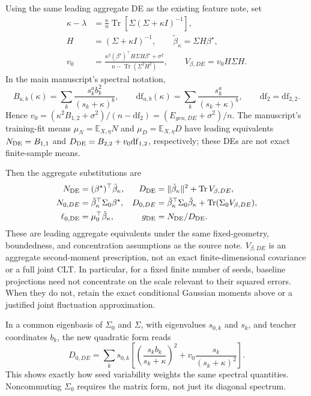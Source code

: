 \documentclass[11pt]{article}
\newcommand{\E}{\mathbb E}
\newcommand{\Tr}{\operatorname{Tr}}
\newcommand{\bstar}{{\beta^{\star}}}
\begin{document}
Using the same leading aggregate DE as the existing feature note, set
\begin{align}
 \kappa-\lambda&=\frac{\kappa}{n}\Tr[\Sigma(\Sigma+\kappa I)^{-1}],\\
 H&=(\Sigma+\kappa I)^{-1},\qquad
 \tilde\beta_\kappa=\Sigma H\bstar,\\
 v_0&=\frac{\kappa^2(\bstar)^\top H\Sigma H\bstar+\sigma^2}
 {n-\Tr(\Sigma^2H^2)},\qquad V_{\beta,DE}=v_0H\Sigma H.
\end{align}
In the main manuscript's spectral notation,
\[
 B_{a,b}(\kappa)=\sum_k\frac{s_k^a b_k^2}{(s_k+\kappa)^b},\qquad
 \mathrm{df}_{a,b}(\kappa)=\sum_k\frac{s_k^a}{(s_k+\kappa)^b},\qquad
 \mathrm{df}_2=\mathrm{df}_{2,2}.
\]
Hence $v_0=(\kappa^2B_{1,2}+\sigma^2)/(n-\mathrm{df}_2)
=(E_{gen,DE}+\sigma^2)/n$. The manuscript's training-fit means
$\mu_N=\E_{X,\eta}N$ and $\mu_D=\E_{X,\eta}D$ have leading equivalents
$N_{\rm DE}=B_{1,1}$ and
$D_{\rm DE}=B_{2,2}+v_0\mathrm{df}_{1,2}$, respectively;
these DEs are not exact finite-sample means.

Then the aggregate substitutions are
\begin{align}
 N_{\rm DE}&=(\bstar)^\top\tilde\beta_\kappa,&
 D_{\rm DE}&=\|\tilde\beta_\kappa\|^2+\Tr V_{\beta,DE},\\
 N_{0,DE}&=\tilde\beta_\kappa^\top \Sigma_0\bstar,&
 D_{0,DE}&=\tilde\beta_\kappa^\top \Sigma_0\tilde\beta_\kappa+\Tr(\Sigma_0 V_{\beta,DE}),\\
 \ell_{0,\rm DE}&=\mu_0^\top\tilde\beta_\kappa,&
 g_{\rm DE}&=N_{\rm DE}/D_{\rm DE}.
\end{align}
These are leading aggregate equivalents under the same fixed-geometry,
boundedness, and concentration assumptions as the source note. $V_{\beta,DE}$ is an
aggregate second-moment prescription, not an exact finite-dimensional
covariance or a full joint CLT. In particular, for a fixed finite number of
seeds, baseline projections need not concentrate on the scale relevant to
their squared errors. When they do not, retain the exact conditional
Gaussian moments above or a justified joint fluctuation approximation.

In a common eigenbasis of $\Sigma_0$ and $\Sigma$, with eigenvalues $s_{0,k}$
and $s_k$, and teacher coordinates $b_k$, the new quadratic form reads
\[
 D_{0,DE}=
 \sum_k s_{0,k}\left[
 \left(\frac{s_kb_k}{s_k+\kappa}\right)^2
 +v_0\frac{s_k}{(s_k+\kappa)^2}\right].
\]
This shows exactly how seed variability weights the same spectral quantities.
Noncommuting $\Sigma_0$ requires the matrix form, not just its diagonal spectrum.
\end{document}

